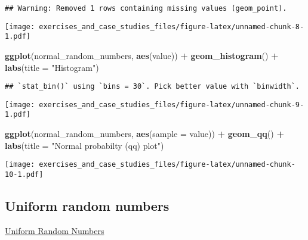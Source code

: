 \documentclass[]{book}
\newenvironment{Shaded}{\begin{snugshade}}{\end{snugshade}}
\newcommand{\DataTypeTok}[1]{\textcolor[rgb]{0.13,0.29,0.53}{#1}}
\newcommand{\DecValTok}[1]{\textcolor[rgb]{0.00,0.00,0.81}{#1}}
\newcommand{\KeywordTok}[1]{\textcolor[rgb]{0.13,0.29,0.53}{\textbf{#1}}}
\newcommand{\NormalTok}[1]{#1}
\newcommand{\OperatorTok}[1]{\textcolor[rgb]{0.81,0.36,0.00}{\textbf{#1}}}
\newcommand{\StringTok}[1]{\textcolor[rgb]{0.31,0.60,0.02}{#1}}
\theoremstyle{definition}
\theoremstyle{definition}
\theoremstyle{definition}
\theoremstyle{remark}
\begin{document}
\begin{verbatim}
## Warning: Removed 1 rows containing missing values (geom_point).
\end{verbatim}

\texttt{[image: exercises\_and\_case\_studies\_files/figure-latex/unnamed-chunk-8-1.pdf]}

\begin{Shaded}
\begin{Highlighting}[]
\KeywordTok{ggplot}\NormalTok{(normal_random_numbers, }\KeywordTok{aes}\NormalTok{(value)) }\OperatorTok{+}
\StringTok{  }\KeywordTok{geom_histogram}\NormalTok{() }\OperatorTok{+}
\StringTok{  }\KeywordTok{labs}\NormalTok{(}\DataTypeTok{title =} \StringTok{"Histogram"}\NormalTok{)}
\end{Highlighting}
\end{Shaded}

\begin{verbatim}
## `stat_bin()` using `bins = 30`. Pick better value with `binwidth`.
\end{verbatim}

\texttt{[image: exercises\_and\_case\_studies\_files/figure-latex/unnamed-chunk-9-1.pdf]}

\begin{Shaded}
\begin{Highlighting}[]
\KeywordTok{ggplot}\NormalTok{(normal_random_numbers, }\KeywordTok{aes}\NormalTok{(}\DataTypeTok{sample =}\NormalTok{ value)) }\OperatorTok{+}
\StringTok{  }\KeywordTok{geom_qq}\NormalTok{() }\OperatorTok{+}
\StringTok{  }\KeywordTok{labs}\NormalTok{(}\DataTypeTok{title =} \StringTok{"Normal probabilty (qq) plot"}\NormalTok{)}
\end{Highlighting}
\end{Shaded}

\texttt{[image: exercises\_and\_case\_studies\_files/figure-latex/unnamed-chunk-10-1.pdf]}

\hypertarget{uniform-random-numbers}{%
\subsection{Uniform random numbers}\label{uniform-random-numbers}}

\href{https://www.itl.nist.gov/div898/handbook/eda/section4/eda422.htm}{Uniform
Random Numbers}

\begin{Shaded}
\end{Shaded}
\end{document}
